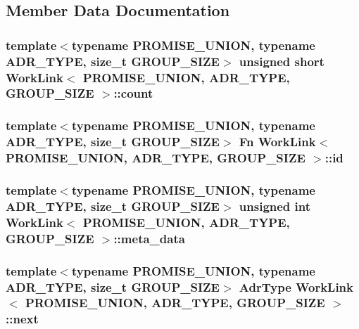 \subsection{Member Data Documentation}
\hypertarget{structWorkLink_a27d203a11b0a67752aad8b698345feae}{
\subsubsection[{count}]{\setlength{\rightskip}{0pt plus 5cm}template$<$typename P\-R\-O\-M\-I\-S\-E\-\_\-\-U\-N\-I\-O\-N, typename A\-D\-R\-\_\-\-T\-Y\-P\-E, size\-\_\-t G\-R\-O\-U\-P\-\_\-\-S\-I\-Z\-E$>$ unsigned short {\bf Work\-Link}$<$ P\-R\-O\-M\-I\-S\-E\-\_\-\-U\-N\-I\-O\-N, A\-D\-R\-\_\-\-T\-Y\-P\-E, G\-R\-O\-U\-P\-\_\-\-S\-I\-Z\-E $>$\-::count}}\label{structWorkLink_a27d203a11b0a67752aad8b698345feae}
\hypertarget{structWorkLink_ac697b370e9710f8c2034eb2ba02f46a5}{
\subsubsection[{id}]{\setlength{\rightskip}{0pt plus 5cm}template$<$typename P\-R\-O\-M\-I\-S\-E\-\_\-\-U\-N\-I\-O\-N, typename A\-D\-R\-\_\-\-T\-Y\-P\-E, size\-\_\-t G\-R\-O\-U\-P\-\_\-\-S\-I\-Z\-E$>$ Fn {\bf Work\-Link}$<$ P\-R\-O\-M\-I\-S\-E\-\_\-\-U\-N\-I\-O\-N, A\-D\-R\-\_\-\-T\-Y\-P\-E, G\-R\-O\-U\-P\-\_\-\-S\-I\-Z\-E $>$\-::id}}\label{structWorkLink_ac697b370e9710f8c2034eb2ba02f46a5}
\hypertarget{structWorkLink_ae81eecf9eb40d41538ed2127ccddc5e4}{
\subsubsection[{meta\-\_\-data}]{\setlength{\rightskip}{0pt plus 5cm}template$<$typename P\-R\-O\-M\-I\-S\-E\-\_\-\-U\-N\-I\-O\-N, typename A\-D\-R\-\_\-\-T\-Y\-P\-E, size\-\_\-t G\-R\-O\-U\-P\-\_\-\-S\-I\-Z\-E$>$ unsigned int {\bf Work\-Link}$<$ P\-R\-O\-M\-I\-S\-E\-\_\-\-U\-N\-I\-O\-N, A\-D\-R\-\_\-\-T\-Y\-P\-E, G\-R\-O\-U\-P\-\_\-\-S\-I\-Z\-E $>$\-::meta\-\_\-data}}\label{structWorkLink_ae81eecf9eb40d41538ed2127ccddc5e4}
\hypertarget{structWorkLink_a12cf1c876e6e92a05f0eeef007d5015a}{
\subsubsection[{next}]{\setlength{\rightskip}{0pt plus 5cm}template$<$typename P\-R\-O\-M\-I\-S\-E\-\_\-\-U\-N\-I\-O\-N, typename A\-D\-R\-\_\-\-T\-Y\-P\-E, size\-\_\-t G\-R\-O\-U\-P\-\_\-\-S\-I\-Z\-E$>$ {\bf Adr\-Type} {\bf Work\-Link}$<$ P\-R\-O\-M\-I\-S\-E\-\_\-\-U\-N\-I\-O\-N, A\-D\-R\-\_\-\-T\-Y\-P\-E, G\-R\-O\-U\-P\-\_\-\-S\-I\-Z\-E $>$\-::next}}\label{structWorkLink_a12cf1c876e6e92a05f0eeef007d5015a}
